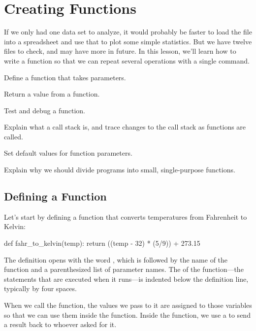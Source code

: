 \section{Creating Functions}

If we only had one data set to analyze, it would probably be faster to
load the file into a spreadsheet and use that to plot some simple
statistics. But we have twelve files to check, and may have more in
future. In this lesson, we'll learn how to write a function so that we
can repeat several operations with a single command.

\begin{objectives}
\begin{swcitemize}
\item
  Define a function that takes parameters.
\item
  Return a value from a function.
\item
  Test and debug a function.
\item
  Explain what a call stack is, and trace changes to the call stack as
  functions are called.
\item
  Set default values for function parameters.
\item
  Explain why we should divide programs into small, single-purpose
  functions.
\end{swcitemize}
\end{objectives}

\subsection{Defining a Function}

Let's start by defining a function  that
converts temperatures from Fahrenheit to Kelvin:

\begin{VerbIn}
def fahr_to_kelvin(temp):
    return ((temp - 32) * (5/9)) + 273.15
\end{VerbIn}

The definition opens with the word , which is followed by
the name of the function and a parenthesized list of parameter names.
The  of the function---the statements
that are executed when it runs---is indented below the definition line,
typically by four spaces.

When we call the function, the values we pass to it are assigned to
those variables so that we can use them inside the function. Inside the
function, we use a  to
send a result back to whoever asked for it.

